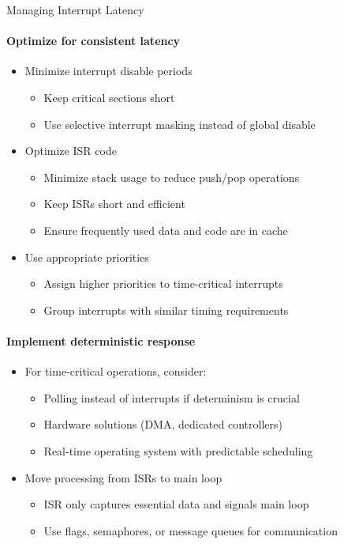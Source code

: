 \begin{KR}{Managing Interrupt Latency}
\paragraph{Optimize for consistent latency}
\begin{itemize}
    \item Minimize interrupt disable periods
    \begin{itemize}
        \item Keep critical sections short
        \item Use selective interrupt masking instead of global disable
    \end{itemize}
    \item Optimize ISR code
    \begin{itemize}
        \item Minimize stack usage to reduce push/pop operations
        \item Keep ISRs short and efficient
        \item Ensure frequently used data and code are in cache
    \end{itemize}
    \item Use appropriate priorities
    \begin{itemize}
        \item Assign higher priorities to time-critical interrupts
        \item Group interrupts with similar timing requirements
    \end{itemize}
\end{itemize}

\paragraph{Implement deterministic response}
\begin{itemize}
    \item For time-critical operations, consider:
    \begin{itemize}
        \item Polling instead of interrupts if determinism is crucial
        \item Hardware solutions (DMA, dedicated controllers)
        \item Real-time operating system with predictable scheduling
    \end{itemize}
    \item Move processing from ISRs to main loop
    \begin{itemize}
        \item ISR only captures essential data and signals main loop
        \item Use flags, semaphores, or message queues for communication
    \end{itemize}
\end{itemize}
\end{KR}






